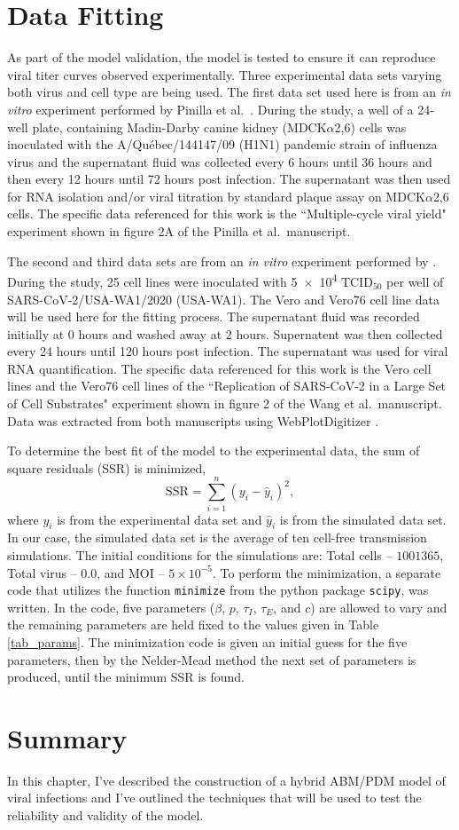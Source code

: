\section{Data Fitting} \label{Data_Fitting}

As part of the model validation, the model is tested to ensure it can reproduce viral titer curves observed experimentally. Three experimental data sets varying both virus and cell type are being used. The first data set used here is from an \emph{in vitro} experiment performed by Pinilla et al.\ \citep{pinilla12}. During the study, a well of a 24-well plate, containing Madin-Darby canine kidney (MDCK$\alpha$2,6) cells was inoculated with the A/Qu\'{e}bec/144147/09 (H1N1) pandemic strain of influenza virus and the supernatant fluid was collected every 6 hours until 36 hours and then every 12 hours until 72 hours post infection. The supernatant was then used for RNA isolation and/or viral titration by standard plaque assay on MDCK$\alpha$2,6 cells. The specific data referenced for this work is the ``Multiple-cycle viral yield" experiment shown in figure 2A of the Pinilla et al.\ manuscript. 

The second and third data sets are from an \emph{in vitro} experiment performed by \cite{wang_susceptibility_2021}. During the study, 25 cell lines were inoculated with \num{5e4} TCID$_{50}$ per well of  SARS-CoV-2/USA-WA1/2020 (USA-WA1). The Vero and Vero76 cell line data will be used here for the fitting process. The supernatant fluid was recorded initially at 0 hours and washed away at 2 hours. Supernatent was then collected every 24 hours until 120 hours post infection. The supernatant was used for viral RNA quantification. The specific data referenced for this work is the Vero cell lines and the Vero76 cell lines of the ``Replication of SARS-CoV-2 in a Large Set of Cell Substrates" experiment shown in figure 2 of the Wang et al.\ manuscript. Data was extracted from both manuscripts using WebPlotDigitizer \citep{WebPlotDigitizer}. 

To determine the best fit of the model to the experimental data, the sum of square residuals (SSR) is minimized, $$\mathrm{SSR} = \sum_{i=1}^{n} (y_i - \hat y_i)^{2},$$ where $y_i$ is from the experimental data set and $\hat y_i$ is from the simulated data set. In our case, the simulated data set is the average of ten cell-free transmission simulations. The initial conditions for the simulations are: Total cells -- $1001365$, Total virus -- $0.0$, and MOI -- $5\times 10^{-5}$. To perform the minimization, a separate code that utilizes the function \texttt{minimize} from the python package \texttt{scipy}, was written. In the code, five parameters ($\beta$, $p$, $\tau_I$, $\tau_E$, and $c$) are allowed to vary and the remaining parameters are held fixed to the values given in Table \ref{tab_params}. The minimization code is given an initial guess for the five parameters, then by the Nelder-Mead method the next set of parameters is produced, until the minimum SSR is found.

\section{Summary}

In this chapter, I've described the construction of a hybrid ABM/PDM model of viral infections and I've outlined the techniques that will be used to test the reliability and validity of the model. 
